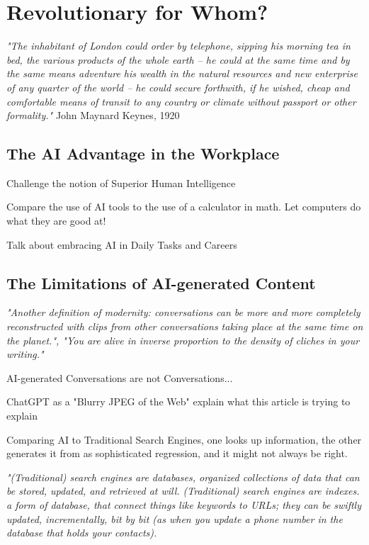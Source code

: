 \setchapterpreamble[u]{\margintoc}
\chapter{Revolutionary for Whom?}

\textit{"The inhabitant of London could order by telephone, sipping his morning tea in bed, the various products of the whole earth -- he could at the same time and by the same means adventure his wealth in the natural resources and new enterprise of any quarter of the world -- he could secure forthwith, if he wished, cheap and comfortable means of transit to any country or climate without passport or other formality."} John Maynard Keynes, 1920 \cite{Keynes2012}




\section{The AI Advantage in the Workplace}

Challenge the notion of Superior Human Intelligence

Compare the use of AI tools to the use of a calculator in math. Let computers do what they are good at!

Talk about embracing AI in Daily Tasks and Careers

\section{The Limitations of AI-generated Content}

\textit{"Another definition of modernity: conversations can be more and more completely reconstructed with clips from other conversations taking place at the same time on the planet.", "You are alive in inverse proportion to the density of cliches in your writing."}\cite{procrustes} 

AI-generated Conversations are not Conversations...

ChatGPT as a "Blurry JPEG of the Web" explain what this article is trying to explain \cite{newyorkerChatGPTBlurry}

Comparing AI to Traditional Search Engines, one looks up information, the other generates it from as sophisticated regression, and it might not always be right. 

\textit{"(Traditional) search engines are databases, organized collections of data that can be stored, updated, and retrieved at will. (Traditional) search engines are indexes. a form of database, that connect things like keywords to URLs; they can be swiftly updated, incrementally, bit by bit (as when you update a phone number in the database that holds your contacts).}

